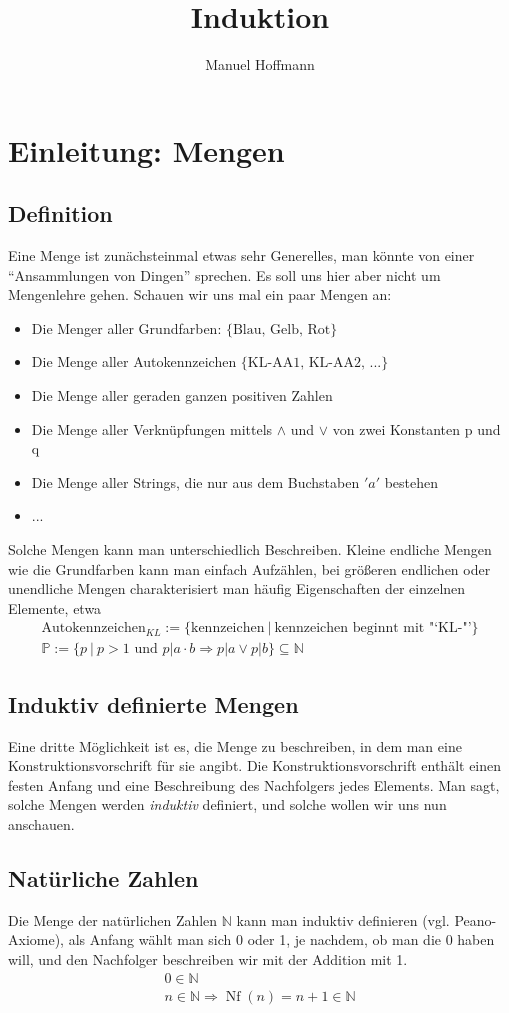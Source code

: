 \documentclass{article}
\author{Manuel Hoffmann}
\title{Induktion}
\begin{document}
\section{Einleitung: Mengen}
\subsection{Definition}
Eine Menge ist zunächsteinmal etwas sehr Generelles, man könnte von einer "`Ansammlungen von Dingen"' sprechen. Es soll uns hier aber nicht um Mengenlehre gehen. Schauen wir uns mal ein paar Mengen an:
\begin{itemize}
  \item Die Menger aller Grundfarben: $\{\text{Blau, Gelb, Rot}\}$
  \item Die Menge aller Autokennzeichen $\{\text{KL-AA1, KL-AA2, ...}\}$
  \item Die Menge aller geraden ganzen positiven Zahlen
  \item Die Menge aller Verknüpfungen mittels $\land$ und $\lor$ von zwei Konstanten p und q
  \item Die Menge aller Strings, die nur aus dem Buchstaben $'a'$ bestehen
  \item ...
\end{itemize}

Solche Mengen kann man unterschiedlich Beschreiben. Kleine endliche Mengen wie die Grundfarben kann man einfach Aufzählen, bei größeren endlichen oder unendliche Mengen charakterisiert man häufig Eigenschaften der einzelnen Elemente, etwa
\begin{gather*}
  \text{Autokennzeichen}_{KL} := \{ \text{kennzeichen} \ | \ \text{kennzeichen beginnt mit "`KL-"'} \}\\
  \mathbb{P} := \{ p \ | \ p > 1 \text{ und } p | a \cdot b \Rightarrow p | a \lor p | b \} \subseteq \mathbb{N}
\end{gather*}


\subsection{Induktiv definierte Mengen}

Eine dritte Möglichkeit ist es, die Menge zu beschreiben, in dem man eine Konstruktionsvorschrift für sie angibt. Die Konstruktionsvorschrift enthält einen festen Anfang und eine Beschreibung des Nachfolgers jedes Elements. Man sagt, solche Mengen werden \emph{induktiv} definiert, und solche wollen wir uns nun anschauen.

\subsection{Natürliche Zahlen}
Die Menge der natürlichen Zahlen $\mathbb{N}$ kann man induktiv definieren (vgl. Peano-Axiome), als Anfang wählt man sich 0 oder 1, je nachdem, ob man die 0 haben will, und den Nachfolger beschreiben wir mit der Addition mit 1.
\begin{gather}
  0 \in \mathbb{N}\\
  n \in \mathbb{N} \Rightarrow \operatorname{Nf}(n) = n + 1 \in \mathbb{N}
\end{gather}
\end{document}
